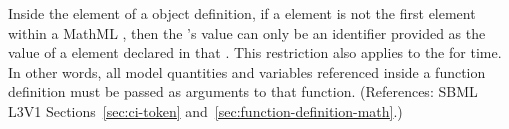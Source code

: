 Inside the  element of a \FunctionDefinition object
definition, if a  element is not the first element within a
MathML , then the 's value can only be an identifier
provided as the value of a  element declared in that
.  This restriction also applies to the  for
time.  In other words, all model quantities and variables referenced inside
a function definition must be passed as arguments to that function.
(References: SBML L3V1 Sections~\ref{sec:ci-token}
and~\ref{sec:function-definition-math}.)
